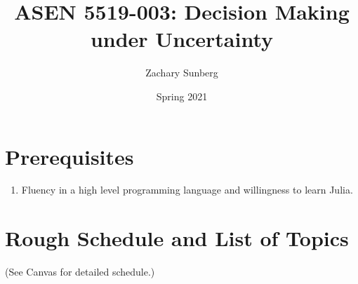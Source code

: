 \documentclass[9pt]{article}
\title{ASEN 5519-003: Decision Making under Uncertainty}
\author{Zachary Sunberg}
\date{Spring 2021}
\begin{document}
\maketitle

\section*{Prerequisites}

\begin{enumerate}[noitemsep]
    \item Fluency in a high level programming language and willingness to learn Julia.
\end{enumerate}

\section*{Rough Schedule and List of Topics}

(See Canvas for detailed schedule.)
\end{document}
